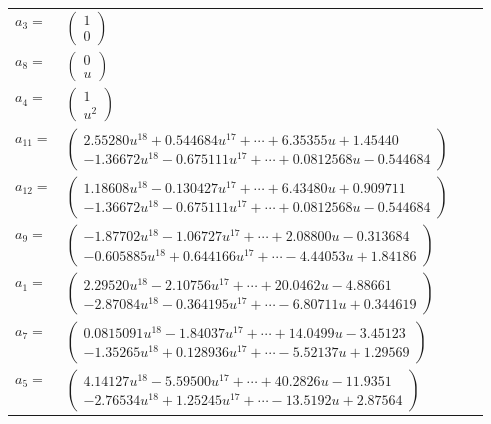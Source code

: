 \documentclass[1p]{elsarticle_modified}
\theoremstyle{definition}
\begin{document}
\begin{tabular}{m{7pt} m{180pt} m{7pt} m{180pt} }
\flushright $a_{3}=$&$\begin{pmatrix}1\\0\end{pmatrix}$ \\
\flushright $a_{8}=$&$\begin{pmatrix}0\\u\end{pmatrix}$ \\
\flushright $a_{4}=$&$\begin{pmatrix}1\\u^2\end{pmatrix}$ \\
\flushright $a_{11}=$&$\begin{pmatrix}2.55280 u^{18}+0.544684 u^{17}+\cdots+6.35355 u+1.45440\\-1.36672 u^{18}-0.675111 u^{17}+\cdots+0.0812568 u-0.544684\end{pmatrix}$ \\
\flushright $a_{12}=$&$\begin{pmatrix}1.18608 u^{18}-0.130427 u^{17}+\cdots+6.43480 u+0.909711\\-1.36672 u^{18}-0.675111 u^{17}+\cdots+0.0812568 u-0.544684\end{pmatrix}$ \\
\flushright $a_{9}=$&$\begin{pmatrix}-1.87702 u^{18}-1.06727 u^{17}+\cdots+2.08800 u-0.313684\\-0.605885 u^{18}+0.644166 u^{17}+\cdots-4.44053 u+1.84186\end{pmatrix}$ \\
\flushright $a_{1}=$&$\begin{pmatrix}2.29520 u^{18}-2.10756 u^{17}+\cdots+20.0462 u-4.88661\\-2.87084 u^{18}-0.364195 u^{17}+\cdots-6.80711 u+0.344619\end{pmatrix}$ \\
\flushright $a_{7}=$&$\begin{pmatrix}0.0815091 u^{18}-1.84037 u^{17}+\cdots+14.0499 u-3.45123\\-1.35265 u^{18}+0.128936 u^{17}+\cdots-5.52137 u+1.29569\end{pmatrix}$ \\
\flushright $a_{5}=$&$\begin{pmatrix}4.14127 u^{18}-5.59500 u^{17}+\cdots+40.2826 u-11.9351\\-2.76534 u^{18}+1.25245 u^{17}+\cdots-13.5192 u+2.87564\end{pmatrix}$ \\

\end{tabular}
\end{document}
